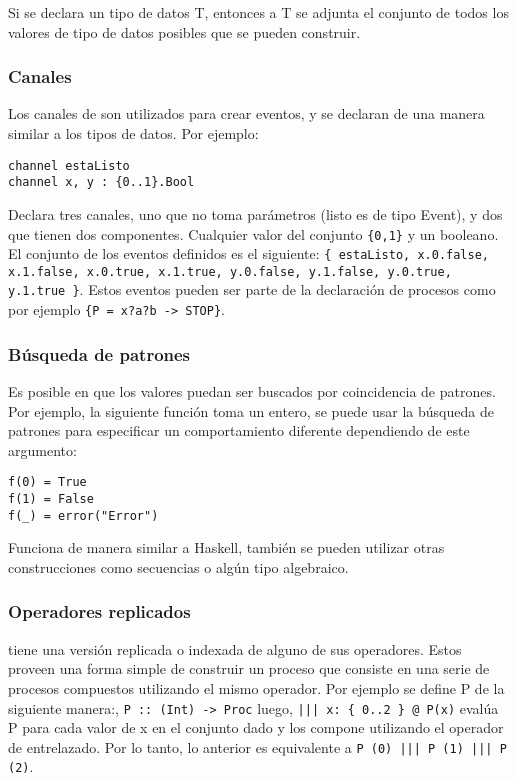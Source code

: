 Si se declara un tipo de datos T, entonces a T se adjunta el conjunto de todos los valores de tipo de datos posibles que se pueden construir. 

\subsubsection{Canales}

Los canales de \CSPm son utilizados para crear eventos, y se declaran de una manera similar a los tipos de datos. Por ejemplo:

\begin{verbatim}
channel estaListo
channel x, y : {0..1}.Bool
\end{verbatim}

Declara tres canales, uno que no toma parámetros (listo es de tipo Event), y dos que tienen dos componentes. Cualquier valor del conjunto \verb={0,1}= y un booleano. El conjunto de los eventos definidos es el siguiente: \verb={ estaListo, x.0.false, x.1.false, x.0.true, x.1.true, y.0.false, y.1.false, y.0.true, y.1.true }=. Estos eventos pueden ser parte de la declaración de procesos como por ejemplo \verb#{P = x?a?b -> STOP}#.

\subsubsection{Búsqueda de patrones}

Es posible en \CSP que los valores puedan ser buscados por coincidencia de patrones. Por ejemplo, la siguiente función toma un entero, se puede usar la búsqueda de patrones para especificar un comportamiento diferente dependiendo de este argumento:

\begin{verbatim}
f(0) = True
f(1) = False
f(_) = error("Error")
\end{verbatim}

Funciona de manera similar a Haskell, también se pueden utilizar otras construcciones como secuencias o algún tipo algebraico.

\subsubsection{Operadores replicados}
\FDR tiene una versión replicada o indexada de alguno de sus operadores. Estos proveen una forma simple de construir un proceso que consiste en una serie de procesos compuestos utilizando el mismo operador. Por ejemplo se define P de la siguiente manera:, \verb=P :: (Int) -> Proc= luego, \verb=||| x: { 0..2 } @ P(x)= evalúa P para cada valor de x en el conjunto dado y los compone utilizando el operador de entrelazado. Por lo tanto, lo anterior es equivalente a \verb=P (0) ||| P (1) ||| P (2)=.


